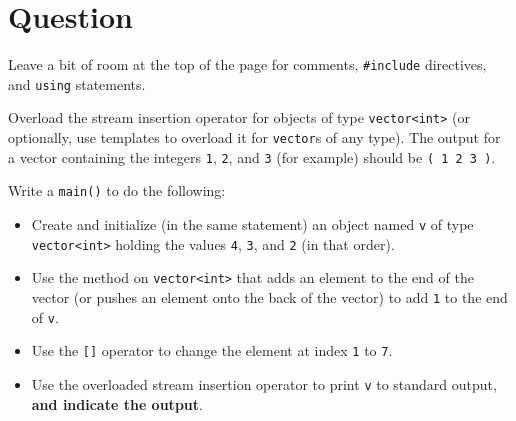 \newEvenPage

\section{Question}

Leave a bit of room at the top of the page for comments,
\texttt{#include} directives, and \texttt{using} statements.

Overload the stream insertion operator for objects of type
\texttt{vector<int>} (or optionally, use templates to overload it for
\texttt{vector}s of any type).  The output for a vector containing the
integers \texttt{1}, \texttt{2}, and \texttt{3} (for
example) should be \texttt{( 1 2 3 )}.

Write a \texttt{main()} to do the following:
\begin{itemize}
  \item Create and initialize (in the same statement) an object named
    \texttt{v} of type \texttt{vector<int>} holding the
    values \texttt{4}, \texttt{3}, and \texttt{2}
    (in that order).
  \item Use the method on \texttt{vector<int>} that adds an element to
    the end of the vector (or pushes an element onto the back of the vector) to
    add \texttt{1} to the end of \texttt{v}.
  \item Use the \texttt{[]} operator to change the element at index
    \texttt{1} to \texttt{7}.
  \item Use the overloaded stream insertion operator to print
    \texttt{v} to standard output, \textbf{and indicate the output}.
\end{itemize}

\newOddPage
\textQuestion{\makePageQuadrilleRuled}

\newpage

